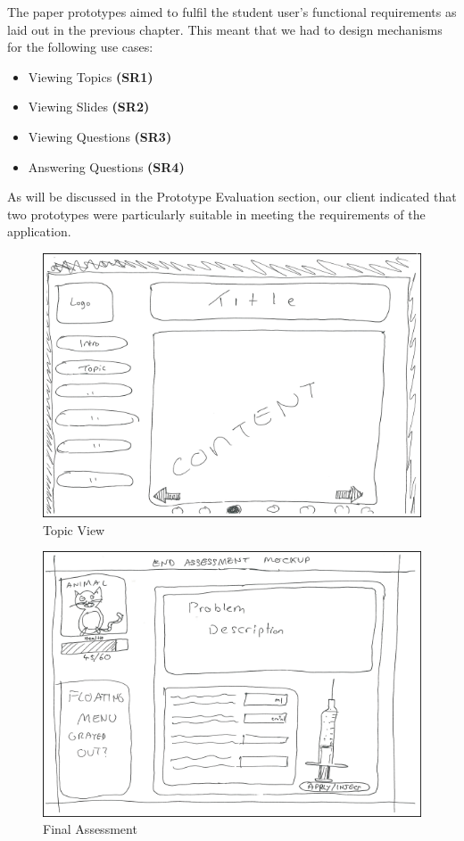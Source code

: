 \documentclass{l3proj}
\begin{document}
The paper prototypes aimed to fulfil the student user's functional requirements as laid out in the previous chapter. This meant that we had to design mechanisms for the following use cases:

\begin{itemize}
\item{Viewing Topics\textbf{ (SR1)}}
\item{Viewing Slides\textbf{ (SR2)}}
\item{Viewing Questions\textbf{ (SR3)}}
\item{Answering Questions\textbf{ (SR4)}}
\end{itemize}

As will be discussed in the Prototype Evaluation section, our client indicated that two prototypes were particularly suitable in meeting the requirements of the application.

\begin{figure}[!htb]
\caption{Topic View}
\includegraphics[width=\linewidth]{images/Prototype2.png}
\end{figure}

\begin{figure}[!htb]  
\caption{Final Assessment}
 \includegraphics[width=\linewidth]{images/Prototype1.png}
\end{figure}
\end{document}
